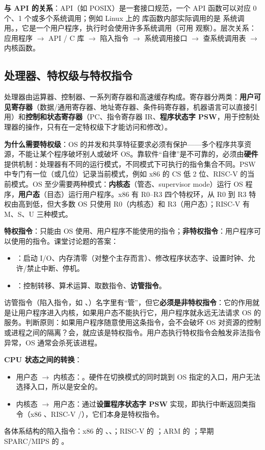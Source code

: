 \textbf{与 API 的关系}：API（如 POSIX）是一套接口规范，一个 API 函数可以对应 0 个、1 个或多个系统调用；例如 Linux 上的  库函数内部实际调用的是  系统调用。，它是一个用户程序，执行时会使用许多系统调用（可用  观察）。层次关系：应用程序 $\to$ API / C 库 $\to$ 陷入指令 $\to$ 系统调用接口 $\to$ 查系统调用表 $\to$ 内核函数。

\subsection{处理器、特权级与特权指令}

处理器由运算器、控制器、一系列寄存器和高速缓存构成。寄存器分两类：\textbf{用户可见寄存器}（数据/通用寄存器、地址寄存器、条件码寄存器，机器语言可以直接引用）和\textbf{控制和状态寄存器}（PC、指令寄存器 IR、\textbf{程序状态字 PSW}，用于控制处理器的操作，只有在一定特权级下才能访问和修改）。

\textbf{为什么需要特权级}：OS 的并发和共享特征要求必须有保护——多个程序共享资源，不能让某个程序破坏别人或破坏 OS。靠软件“自律”是不可靠的，必须由\textbf{硬件}提供机制：处理器有不同的运行模式，不同模式下可执行的指令集合不同。PSW 中专门有一位（或几位）记录当前模式，例如 x86 的 CS 低 2 位、RISC-V 的当前模式。OS 至少需要两种模式：\textbf{内核态}（管态、supervisor mode）运行 OS 程序，\textbf{用户态}（目态）运行用户程序。x86 有 R0–R3 四个特权环，从 R0 到 R3 特权由高到低，但大多数 OS 只使用 R0（内核态）和 R3（用户态）；RISC-V 有 M、S、U 三种模式。

\textbf{特权指令}：只能由 OS 使用、用户程序不能使用的指令；\textbf{非特权指令}：用户程序可以使用的指令。课堂讨论题的答案：
\begin{itemize}
    \item {}：启动 I/O、内存清零（对整个主存而言）、修改程序状态字、设置时钟、允许/禁止中断、停机。
    \item {}：控制转移、算术运算、取数指令、\textbf{访管指令}。
\end{itemize}
\ez 访管指令（陷入指令，如 、）名字里有“管”，但它\textbf{必须是非特权指令}：它的作用就是让用户程序进入内核，如果用户态不能执行它，用户程序就永远无法请求 OS 的服务。判断原则：如果用户程序随意使用这条指令，会不会破坏 OS 对资源的控制或进程之间的隔离？会，就应该是特权指令。用户态执行特权指令会触发非法指令异常，OS 通常会杀死该进程。

\textbf{CPU 状态之间的转换}：
\begin{itemize}
    \item 用户态 $\to$ 内核态：。硬件在切换模式的同时跳到 OS 指定的入口，用户无法选择入口，所以是安全的。
    \item 内核态 $\to$ 用户态：通过\textbf{设置程序状态字 PSW} 实现，即执行中断返回类指令（x86 、RISC-V /），它们本身是特权指令。
\end{itemize}
各体系结构的陷入指令：x86 的 、、；RISC-V 的 ；ARM 的 ；早期 SPARC/MIPS 的 。

